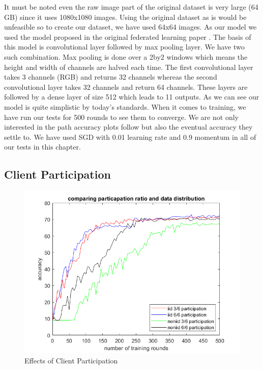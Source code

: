 \documentclass[11pt]{article}
\begin{document}
\par It must be noted even the raw image part of the original dataset is very large (64 GB) since it uses 1080x1080 images. Using the original dataset as is would be unfeasible so to create our dataset, we have used 64x64 images. As our model we used the model proposed in the original federated learning paper \cite{originalFL}. The basis of this model is convolutional layer followed by max pooling layer. We have two such combination. Max pooling is done over a 2by2 windows which means the height and width of channels are halved each time. The first convolutional layer takes 3 channels (RGB) and returns 32 channels whereas the second convolutional layer takes 32 channels and return 64 channels. These layers are followed by a dense layer of size 512 which leads to 11 outputs. As we can see our model is quite simplistic by today’s standards. When it comes to training, we have run our tests for 500 rounds to see them to converge. We are not only interested in the path accuracy plots follow but also the eventual accuracy they settle to. We have used SGD with 0.01 learning rate and 0.9 momentum in all of our tests in this chapter.

\subsection{Client Participation}

\begin{figure}[h!]
\centering
  \includegraphics[scale=0.5]{ratioIIDvsNonIID}
  \caption{Effects of Client Participation}
  \label{fig:clientSelection}
\end{figure}
\end{document}
